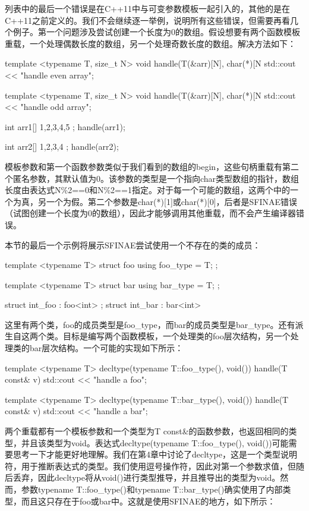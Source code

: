 列表中的最后一个错误是在C++11中与可变参数模板一起引入的，其他的是在C++11之前定义的。我们不会继续逐一举例，说明所有这些错误，但需要再看几个例子。第一个问题涉及尝试创建一个长度为0的数组。假设想要有两个函数模板重载，一个处理偶数长度的数组，另一个处理奇数长度的数组。解决方法如下：

\begin{cpp}
template <typename T, size_t N>
void handle(T(&arr)[N], char(*)[N %
{
	std::cout << "handle even array\n";
}

template <typename T, size_t N>
void handle(T(&arr)[N], char(*)[N %
{
	std::cout << "handle odd array\n";
}

int arr1[]{ 1,2,3,4,5 };
handle(arr1);

int arr2[]{ 1,2,3,4 };
handle(arr2);
\end{cpp}

模板参数和第一个函数参数类似于我们看到的数组的begin，这些句柄重载有第二个匿名参数，其默认值为0。该参数的类型是一个指向char类型数组的指针，数组长度由表达式N\%2==0和N\%2==1指定。对于每一个可能的数组，这两个中的一个为真，另一个为假。第二个参数是char(*)[1]或char(*)[0]，后者是SFINAE错误（试图创建一个长度为0的数组），因此才能够调用其他重载，而不会产生编译器错误。

本节的最后一个示例将展示SFINAE尝试使用一个不存在的类的成员：

\begin{cpp}
template <typename T>
struct foo
{
	using foo_type = T;
};

template <typename T>
struct bar
{
	using bar_type = T;
};

struct int_foo : foo<int> {};
struct int_bar : bar<int> {}
\end{cpp}

这里有两个类，foo的成员类型是foo\_type，而bar的成员类型是bar\_type。还有派生自这两个类。目标是编写两个函数模板，一个处理类的foo层次结构，另一个处理类的bar层次结构。一个可能的实现如下所示：

\begin{cpp}
template <typename T>
decltype(typename T::foo_type(), void()) handle(T const& v)
{
	std::cout << "handle a foo\n";
}

template <typename T>
decltype(typename T::bar_type(), void()) handle(T const& v)
{
	std::cout << "handle a bar\n";
}
\end{cpp}

两个重载都有一个模板参数和一个类型为T const\&的函数参数，也返回相同的类型，并且该类型为void。表达式decltype(typename T::foo\_type(), void())可能需要思考一下才能更好地理解。我们在第4章中讨论了decltype，这是一个类型说明符，用于推断表达式的类型。我们使用逗号操作符，因此对第一个参数求值，但随后丢弃，因此decltype将从void()进行类型推导，并且推导出的类型为void。然而，参数typename T::foo\_type()和typename T::bar\_type()确实使用了内部类型，而且这只存在于foo或bar中。这就是使用SFINAE的地方，如下所示：

